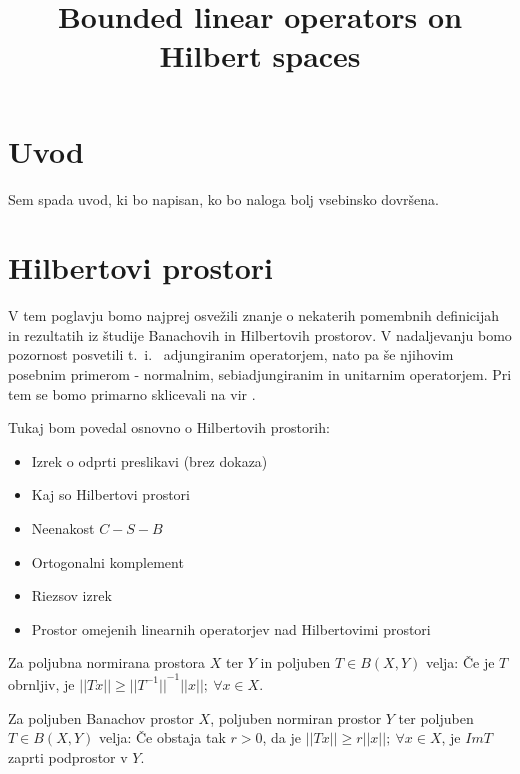 \documentclass[mat2]{matdelo}
\title{Bounded linear operators on Hilbert spaces}
\newcommand{\abs}[1]{\ensuremath{\lvert #1 \rvert}}
\newcommand{\norm}[1]{\abs{\abs{#1}}}
\begin{document}
	
	\tableofcontents
	
	\section{Uvod}\label{sect:intro}
	Sem spada uvod, ki bo napisan, ko bo naloga bolj vsebinsko dovršena.
	
	\section{Hilbertovi prostori}
	V tem poglavju bomo najprej osvežili znanje o nekaterih pomembnih definicijah in rezultatih iz študije Banachovih in Hilbertovih prostorov. V nadaljevanju bomo pozornost posvetili t.~i.~ adjungiranim operatorjem, nato pa še njihovim posebnim primerom - normalnim, sebiadjungiranim in unitarnim operatorjem. Pri tem se bomo primarno sklicevali na vir \cite{bib:Rynne}.
	
		Tukaj bom povedal osnovno o Hilbertovih prostorih: \begin{itemize}
			\item Izrek o odprti preslikavi (brez dokaza)
			\item Kaj so Hilbertovi prostori
			\item Neenakost $C-S-B$
			\item Ortogonalni komplement
			\item Riezsov izrek
			\item Prostor omejenih linearnih operatorjev nad Hilbertovimi prostori
		\end{itemize}
		
		\begin{lema}
			\label{lem:invnorm}
			Za poljubna normirana prostora $X$ ter $Y$ in poljuben $T\in B(X, Y)$ velja: Če je $T$ obrnljiv, je $\norm{Tx}\geq \norm{T^{-1}}^{-1}\norm{x};~\forall x\in X$.
		\end{lema}
		
		\begin{lema}
			\label{lem:banzap}
			Za poljuben Banachov prostor $X$, poljuben normiran prostor $Y$ ter poljuben $T\in B(X, Y)$ velja: Če obstaja tak $r>0$, da je $\norm{Tx}\geq r\norm{x};~\forall x\in X$, je $ImT$ zaprti podprostor v $Y$.
		\end{lema}
		
\end{document}

